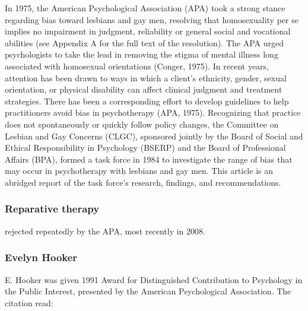 In 1975, the American Psychological Association (APA) took a strong stance regarding bias toward lesbians and gay men, resolving that homosexuality per se implies no impairment in judgment, reliability or general social and vocational abilities (see Appendix A for the full text of the resolution). The APA urged psychologists to take the lead in removing the stigma of mental illness long associated with homosexual orientations (Conger, 1975). In recent years, attention has been drawn to ways in which a client's ethnicity, gender, sexual orientation, or physical disability can affect clinical judgment and treatment strategies. There has been a corresponding effort to develop guidelines to help practitioners avoid bias in psychotherapy (APA, 1975). Recognizing that practice does not spontaneously or quickly follow policy changes, the Committee on Lesbian and Gay Concerns (CLGC), sponsored jointly by the Board of Social and Ethical Responsibility in Psychology (BSERP) and the Board of Professional Affairs (BPA), formed a task force in 1984 to investigate the range of bias that may occur in psychotherapy with lesbians and gay men. This article is an abridged report of the task force's research, findings, and recommendations.

\subsubsection{Reparative therapy}
\label{reparativetherapy}

rejected repeatedly by the APA, most recently in 2008.

\subsubsection{Evelyn Hooker}
\label{evelynhooker}

E. Hooker was given 1991 Award for Distinguished Contribution to Psychology in the Public Interest, presented by the American Psychological Association. The citation read:

